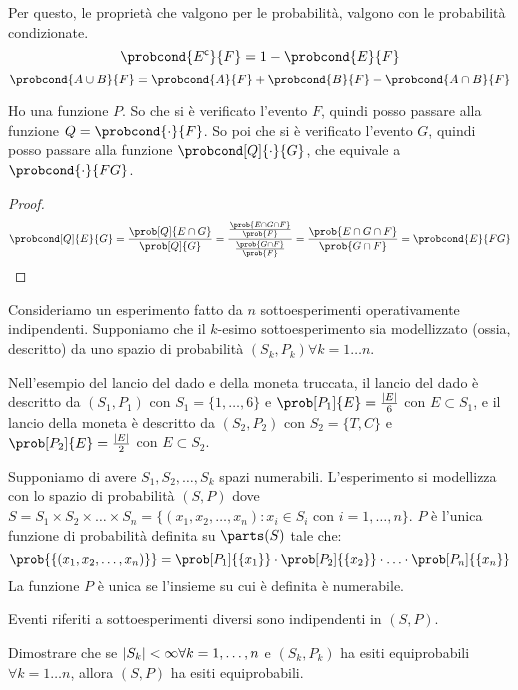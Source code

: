Per questo, le propriet\`a che valgono per le probabilit\`a, valgono con le probabilit\`a condizionate.
\[
\probcond{E^{\compl}}{F} = 1 - \probcond{E}{F}
\]
\[
\probcond{A \cup B}{F} = \probcond{A}{F} + \probcond{B}{F} - \probcond{A \cap B}{F}
\]
\begin{fact}
Ho una funzione $P$. So che si \`e verificato l'evento $F$, quindi posso passare alla funzione $Q = \probcond{\cdot}{F}$. So poi che si \`e verificato l'evento $G$, quindi posso passare alla funzione $\probcond[Q]{\cdot}{G}$, che equivale a $\probcond{\cdot}{FG}$.
\end{fact}
\begin{proof}
\[
\probcond[Q]{E}{G} = \frac{\prob[Q]{E \cap G}}{\prob[Q]{G}} = \frac{\frac{\prob{E \cap G \cap F}}{\prob{F}}}{\frac{\prob{G \cap F}}{\prob{F}}} = \frac{\prob{E \cap G \cap F}}{\prob{G \cap F}} = \probcond{E}{FG}
\]
\end{proof}

Consideriamo un esperimento fatto da $n$ sottoesperimenti operativamente indipendenti. Supponiamo che il $k$-esimo sottoesperimento sia modellizzato (ossia, descritto) da uno spazio di probabilit\`a $(S_k, P_k) \forall k = 1 \ldots n$.

Nell'esempio del lancio del dado e della moneta truccata, il lancio del dado \`e descritto da $(S_1, P_1)$ con $S_1 = \{ 1, \ldots, 6 \}$ e $\prob[P_1]{E} = \frac{\abs{E}}{6}$ con $E \subset S_1$, e il lancio della moneta \`e descritto da $(S_2, P_2)$ con $S_2 = \{ T, C \}$ e $\prob[P_2]{E} = \frac{\abs{E}}{2}$ con $E \subset S_2$.

Supponiamo di avere $S_1, S_2, \ldots, S_k$ spazi numerabili. L'esperimento si modellizza con lo spazio di probabilit\`a $(S, P)$ dove $S = S_1 \times S_2 \times \ldots \times S_n = \{ (x_1, x_2, \ldots, x_n) : x_i \in S_i$ con $i = 1, \ldots, n \}$. $P$ \`e l'unica funzione di probabilit\`a definita su $\parts(S)$ tale che:
\[
\prob{\{(x_1, x_2, \ldots, x_n)\}} = \prob[P_1]{\{x_1\}} \cdot \prob[P_2]{\{x_2\}} \cdot \ldots \cdot \prob[P_n]{\{x_n\}}
\]
La funzione $P$ \`e unica se l'insieme su cui \`e definita \`e numerabile.

Eventi riferiti a sottoesperimenti diversi sono indipendenti in $(S, P)$.

\begin{esercizio}
Dimostrare che se $\left\lvert{S_k}\right\rvert < \infty \forall  k = 1, \ldots, n$ e $(S_k, P_k)$ ha esiti equiprobabili $\forall  k = 1 \dots n$, allora $(S,P)$ ha esiti equiprobabili.
\end{esercizio}

